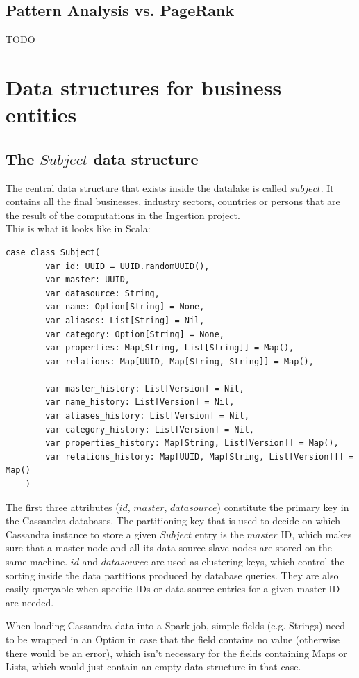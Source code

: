 \documentclass[
        a4paper,     %
        titlepage,   %
        oneside,     %
        parskip      %
        ]{scrartcl}  %
\begin{document}
    \subsection{Pattern Analysis vs. PageRank}
    TODO

  \section{Data structures for business entities}
    \subsection{The $Subject$ data structure}
    The central data structure that exists inside the datalake is called $subject$.
    It contains all the final businesses, industry sectors, countries or persons
    that are the result of the computations in the Ingestion project.\\
    This is what it looks like in Scala:
    \begin{lstlisting}[style=scalaStyle,caption=Subject]
    case class Subject(
    	var id: UUID = UUID.randomUUID(),
    	var master: UUID,
    	var datasource: String,
    	var name: Option[String] = None,
    	var aliases: List[String] = Nil,
    	var category: Option[String] = None,
    	var properties: Map[String, List[String]] = Map(),
    	var relations: Map[UUID, Map[String, String]] = Map(),

    	var master_history: List[Version] = Nil,
    	var name_history: List[Version] = Nil,
    	var aliases_history: List[Version] = Nil,
    	var category_history: List[Version] = Nil,
    	var properties_history: Map[String, List[Version]] = Map(),
    	var relations_history: Map[UUID, Map[String, List[Version]]] = Map()
    )
    \end{lstlisting}

    The first three attributes ($id$, $master$, $datasource$) constitute the
    primary key in the Cassandra databases.
    The partitioning key that is used to decide on which Cassandra instance to store
    a given $Subject$ entry is the $master$ ID, which makes sure that a master node
    and all its data source slave nodes are stored on the same machine.
    $id$ and $datasource$ are used as clustering keys, which control the sorting
    inside the data partitions produced by database queries. They are also easily
    queryable when specific IDs or data source entries for a given master ID are
    needed.

    When loading Cassandra data into a Spark job, simple fields (e.g. Strings)
    need to be wrapped in an Option in case that the field contains no value
    (otherwise there would be an error), which isn't necessary for the fields
    containing Maps or Lists, which would just contain an empty data structure
    in that case.
\end{document}
